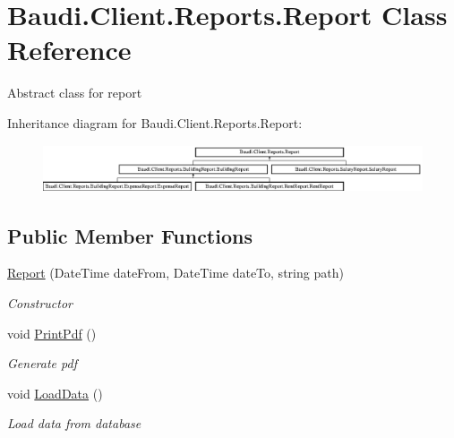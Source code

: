 \hypertarget{class_baudi_1_1_client_1_1_reports_1_1_report}{}\section{Baudi.\+Client.\+Reports.\+Report Class Reference}
\label{class_baudi_1_1_client_1_1_reports_1_1_report}


Abstract class for report  


Inheritance diagram for Baudi.\+Client.\+Reports.\+Report\+:\begin{figure}[H]
\begin{center}
\leavevmode
\includegraphics[height=1.403509cm]{class_baudi_1_1_client_1_1_reports_1_1_report}
\end{center}
\end{figure}
\subsection*{Public Member Functions}
\begin{DoxyCompactItemize}
\item 
\hyperlink{class_baudi_1_1_client_1_1_reports_1_1_report_a0333d5cd2a35558bcddf6d9e8e93396b}{Report} (Date\+Time date\+From, Date\+Time date\+To, string path)
\begin{DoxyCompactList}\small\item\em Constructor \end{DoxyCompactList}\item 
void \hyperlink{class_baudi_1_1_client_1_1_reports_1_1_report_a66ba50137d9f66b555b5ec6c9fd05d7a}{Print\+Pdf} ()
\begin{DoxyCompactList}\small\item\em Generate pdf \end{DoxyCompactList}\item 
void \hyperlink{class_baudi_1_1_client_1_1_reports_1_1_report_aaa0eddde1405fc0a80f5f092cabd54fa}{Load\+Data} ()
\begin{DoxyCompactList}\small\item\em Load data from database \end{DoxyCompactList}\end{DoxyCompactItemize}
